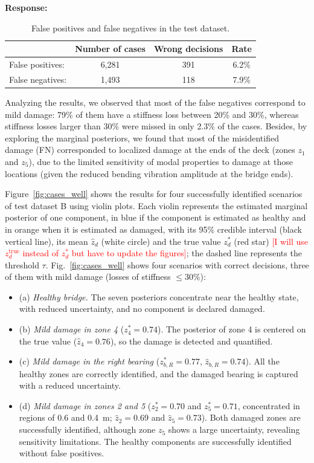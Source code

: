 \documentclass[11pt]{article}
\newenvironment{response}{\par\smallskip\noindent\color{resp}\textbf{Response:}\ }{\par}
\begin{document}
\begin{response}
\begin{table}[H]
	\centering\small
	\caption{False positives and false negatives in the test dataset.}
	\label{tab:fpfn}
	\begin{tabular}{>{\raggedright\arraybackslash}p{2.4cm}ccc}
		\toprule
		& Number of cases & Wrong decisions & Rate \\
		\midrule
		False positives: & 6,281 & 391 & 6.2\% \\
		False negatives: & 1,493 & 118 & 7.9\% \\
		\bottomrule
	\end{tabular}
\end{table} 
Analyzing the results, we observed that most of the false negatives correspond to mild damage: 79\% of them have a stiffness loss between 20\% and 30\%, whereas stiffness losses larger than 30\% were missed in only 2.3\% of the cases. 
Besides, by exploring the marginal posteriors, we found that most of the misidentified damage (FN) corresponded to localized damage at the ends of the deck (zones $z_{1}$ and $z_{5}$), due to the limited sensitivity of modal properties to damage at those locations (given the reduced bending vibration amplitude at the bridge ends). 

Figure~\ref{fig:cases_well} shows the results for four successfully identified scenarios of test dataset B using violin plots. 
Each violin represents the estimated marginal posterior of one component, in blue if the component is estimated as healthy and in orange when it is estimated as damaged, with its 95\% credible interval (black vertical line), its mean $\hat z_d$ (white circle) and the true value $z_d^*$ (red star) \textcolor{red}{[I will use $z_d^{\text{true}}$ instead of $z_d^*$ but have to update the figures]}; the dashed line represents the threshold $\tau$. Fig.~\ref{fig:cases_well} shows four scenarios with correct decisions, three of them with mild damage (losses of stiffness $\leq30\%$):
\begin{itemize}[leftmargin=*,label={}]
	\item (a) \emph{Healthy bridge.} The seven posteriors concentrate near the healthy state, with reduced uncertainty, and no component is declared damaged.
	\item (b) \emph{Mild damage in zone 4} ($z_4^*=0.74$). The posterior of zone 4 is centered on the true value ($\hat z_4=0.76$), so the damage is detected and quantified.
	\item (c) \emph{Mild damage in the right bearing} ($z_{b,R}^*=0.77$, $\hat z_{b,R}=0.74$). All the healthy zones are correctly identified, and the damaged bearing is captured with a reduced uncertainty. 
	\item  (d) \emph{Mild damage in zones 2 and 5} ($z_2^*=0.70$ and $z_5^*=0.71$, concentrated in regions of 0.6 and 0.4~m; $\hat z_2=0.69$ and
	$\hat z_5=0.73$). Both damaged zones are successfully identified, although zone $z_5$ shows a large uncertainty, revealing sensitivity limitations. The healthy components are successfully identified without false positives. 
\end{itemize}


\end{response}
\end{document}
